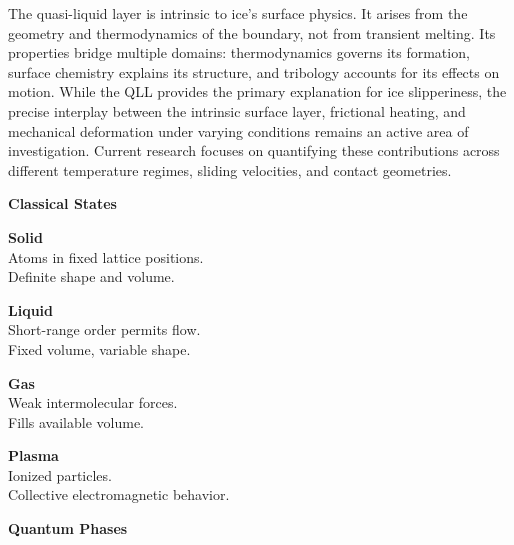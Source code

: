 The quasi-liquid layer is intrinsic to ice's surface physics. It arises from the geometry and thermodynamics of the boundary, not from transient melting. Its properties bridge multiple domains: thermodynamics governs its formation, surface chemistry explains its structure, and tribology accounts for its effects on motion. While the QLL provides the primary explanation for ice slipperiness, the precise interplay between the intrinsic surface layer, frictional heating, and mechanical deformation under varying conditions remains an active area of investigation. Current research focuses on quantifying these contributions across different temperature regimes, sliding velocities, and contact geometries.
\newpage

\begin{tcolorbox}[
  enhanced,
  colback=blue!2,
  colframe=blue!35,
  coltitle=white,
  fonttitle=\bfseries\Large,
  title={Phases of Matter},
  attach boxed title to top center={yshift=-2mm},
  boxed title style={colback=blue!35, sharp corners},
  arc=0mm,
  boxrule=0.5pt,
  left=6pt,
  right=6pt,
  top=6pt,
  bottom=6pt,
  width=\textwidth,
  height=24cm
]

\begin{multicols}{2}
\raggedright

\colorbox{blue!15}{\textbf{\large Classical States}}\vspace{3pt}

\textbf{Solid}\\
{\footnotesize Atoms in fixed lattice positions.\\Definite shape and volume.}\vspace{6pt}

\textbf{Liquid}\\
{\footnotesize Short-range order permits flow.\\Fixed volume, variable shape.}\vspace{6pt}

\textbf{Gas}\\
{\footnotesize Weak intermolecular forces.\\Fills available volume.}\vspace{6pt}

\textbf{Plasma}\\
{\footnotesize Ionized particles.\\Collective electromagnetic behavior.}\vspace{12pt}

\colorbox{blue!15}{\textbf{\large Quantum Phases}}\vspace{3pt}


\end{multicols}
\end{tcolorbox}
